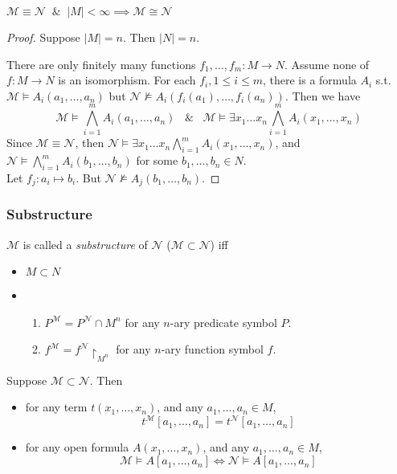 \documentclass[UTF8,aspectratio=43,11pt,colorlinks,compress,openany]{beamer}%
\begin{document}
\begin{frame}\frametitle{}
\begin{theorem}
$\mathcal{M}\equiv\mathcal{N}\;\;\&\;\;|M|<\infty\implies\mathcal{M}\cong\mathcal{N}$
\end{theorem}
\begin{proof}
Suppose $|M|=n$. Then $|N|=n$.

There are only finitely many functions $f_1,\dots,f_m: M\to N$. Assume none of $f: M\to N$ is an isomorphism. For each $f_i, 1\leq i\leq m$, there is a formula $A_i$ s.t. $\mathcal{M}\vDash A_i(a_1,\dots,a_n)$ but $\mathcal{N}\nvDash A_i(f_i(a_1),\dots,f_i(a_n))$. Then we have
\[\mathcal{M}\vDash\bigwedge\limits_{i=1}^m A_i(a_1,\dots,a_n)\;\;\;\&\;\;\;\mathcal{M}\vDash\exists x_1\dots x_n\bigwedge\limits_{i=1}^m A_i(x_1,\dots,x_n)\]
Since $\mathcal{M}\equiv\mathcal{N}$, then $\mathcal{N}\vDash\exists x_1\dots x_n\bigwedge\limits_{i=1}^m A_i(x_1,\dots,x_n)$, and $\mathcal{N}\vDash\bigwedge\limits_{i=1}^m A_i(b_1,\dots,b_n)$ for some $b_1,\dots,b_n\in N$.\\
Let $f_j: a_i\mapsto b_i$. But $\mathcal{N}\nvDash A_j(b_1,\dots,b_n)$.
\end{proof}
\end{frame}

\begin{frame}\frametitle{Substructure}
	\begin{definition}[Substructure]
		$\mathcal{M}$ is called a \emph{substructure} of $\mathcal{N}$ ($\mathcal{M}\subset\mathcal{N}$) iff
		\begin{itemize}
			\item $M\subset N$
			\item
			\begin{enumerate}
				\item $P^{\mathcal{M}}=P^{\mathcal{N}}\cap M^n$ for any $n$-ary predicate symbol $P$.
				\item $f^{\mathcal{M}}=f^{\mathcal{N}}{\restriction_{M^n}}$ for any $n$-ary function symbol $f$.
			\end{enumerate}
		\end{itemize}
	\end{definition}
	\begin{block}{}
	Suppose $\mathcal{M}\subset\mathcal{N}$. Then
		\begin{itemize}
			\item for any term $t(x_1,\dots,x_n)$, and any $a_1,\dots,a_n\in M$,
			\[t^{\mathcal{M}}[a_1,\dots,a_n]=t^{\mathcal{N}}[a_1,\dots,a_n]\]
			\item for any open formula $A(x_1,\dots,x_n)$, and any $a_1,\dots,a_n\in M$,
			\[\mathcal{M}\vDash A[a_1,\dots,a_n]\iff\mathcal{N}\vDash A[a_1,\dots,a_n]\]
		\end{itemize} 
	\end{block}
\end{frame}
\end{document}
